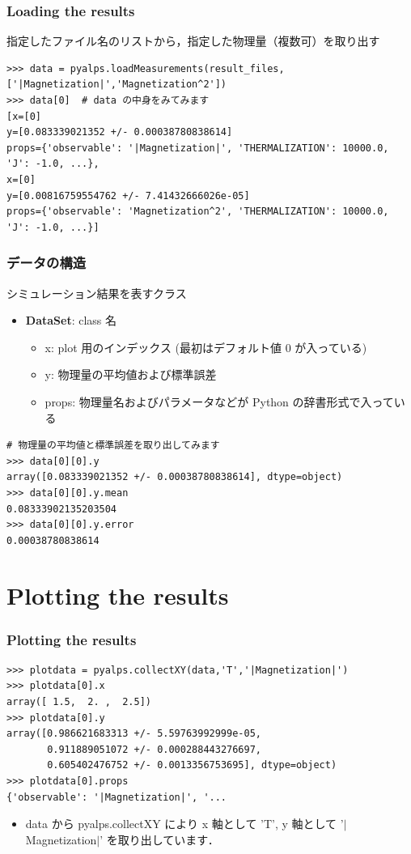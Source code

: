 \begin{frame}[t,fragile]
\frametitle{Loading the results}
指定したファイル名のリストから，指定した物理量（複数可）を取り出す
\begin{lstlisting}
>>> data = pyalps.loadMeasurements(result_files,['|Magnetization|','Magnetization^2'])
>>> data[0]  # data の中身をみてみます
[x=[0]
y=[0.083339021352 +/- 0.00038780838614]
props={'observable': '|Magnetization|', 'THERMALIZATION': 10000.0, 'J': -1.0, ...}, 
x=[0]
y=[0.00816759554762 +/- 7.41432666026e-05]
props={'observable': 'Magnetization^2', 'THERMALIZATION': 10000.0, 'J': -1.0, ...}]
\end{lstlisting}
\end{frame}

\begin{frame}[t,fragile]
\frametitle{データの構造}
シミュレーション結果を表すクラス
\begin{itemize}
\item \textbf{DataSet}: class 名
  \begin{itemize}
  \item x: plot 用のインデックス (最初はデフォルト値 0 が入っている)
  \item y: 物理量の平均値および標準誤差
  \item props: 物理量名およびパラメータなどが Python の辞書形式で入っている
  \end{itemize}
\end{itemize}

\begin{lstlisting}
# 物理量の平均値と標準誤差を取り出してみます
>>> data[0][0].y
array([0.083339021352 +/- 0.00038780838614], dtype=object)
>>> data[0][0].y.mean
0.08333902135203504
>>> data[0][0].y.error
0.00038780838614
\end{lstlisting}
\end{frame}

\section{Plotting the results}
\begin{frame}[t,fragile]
\frametitle{Plotting the results}
\begin{lstlisting}
>>> plotdata = pyalps.collectXY(data,'T','|Magnetization|')
>>> plotdata[0].x
array([ 1.5,  2. ,  2.5])
>>> plotdata[0].y
array([0.986621683313 +/- 5.59763992999e-05,
       0.911889051072 +/- 0.000288443276697,
       0.605402476752 +/- 0.0013356753695], dtype=object)
>>> plotdata[0].props
{'observable': '|Magnetization|', '...
\end{lstlisting}
\begin{itemize}
\item data から pyalps.collectXY により x 軸として 'T', y 軸として '$|$Magnetization$|$' を取り出しています．
\end{itemize}
\end{frame}

